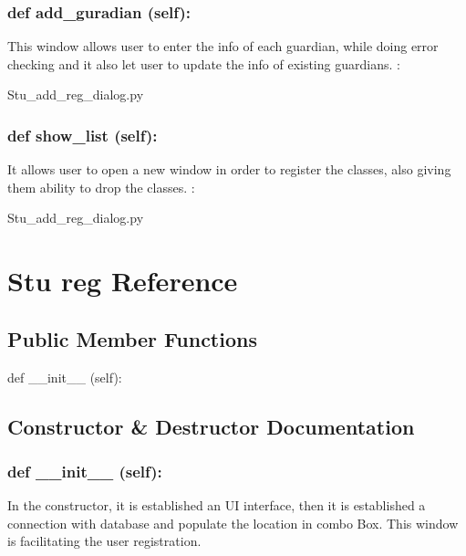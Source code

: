 \hypertarget{class_poly_a14a7ad77ce612b0c54f531d307ee4b39}{
\subsubsection[{def add_guradian (self):}]{\setlength{\rightskip}{0pt plus 5cm}def {add\_guradian} (self):}}\label{class_poly_a14a7ad77ce612b0c54f531d307ee4b39}
This window allows user to enter the info of each guardian, while doing error checking and it also let user to update the info of existing guardians. 
:\begin{DoxyCompactItemize}
\item 
Stu\_add\_reg\_dialog.\-py\end{DoxyCompactItemize}


\hypertarget{class_poly_a14a7ad77ce612b0c54f531d307ee4b39}{
\subsubsection[{def show_list (self):}]{\setlength{\rightskip}{0pt plus 5cm}def {show\_list} (self):}}\label{class_poly_a14a7ad77ce612b0c54f531d307ee4b39}
It allows user to open a new window in order to register the classes, also giving them ability to drop the classes.
:\begin{DoxyCompactItemize}
\item 
Stu\_add\_reg\_dialog.\-py\end{DoxyCompactItemize}

\hypertarget{Stu_reg}{\section{Stu reg Reference}
\label{Stu_reg}
}
\subsection*{Public Member Functions}
\begin{DoxyCompactItemize}
\item 
def {\_\_init\_\_} (self):
\end{DoxyCompactItemize}

\subsection{Constructor \& Destructor Documentation}
\hypertarget{class_poly_aa3def076b74bed67904976ad4f9fe9b1}{
\subsubsection[{def __init__ (self):}]{\setlength{\rightskip}{0pt plus 5cm}def {\_\_init\_\_} (self): 
}}
In the constructor, it is established an UI interface, then it is  established a connection with database and populate the location in combo Box. This window is facilitating the user registration. 
